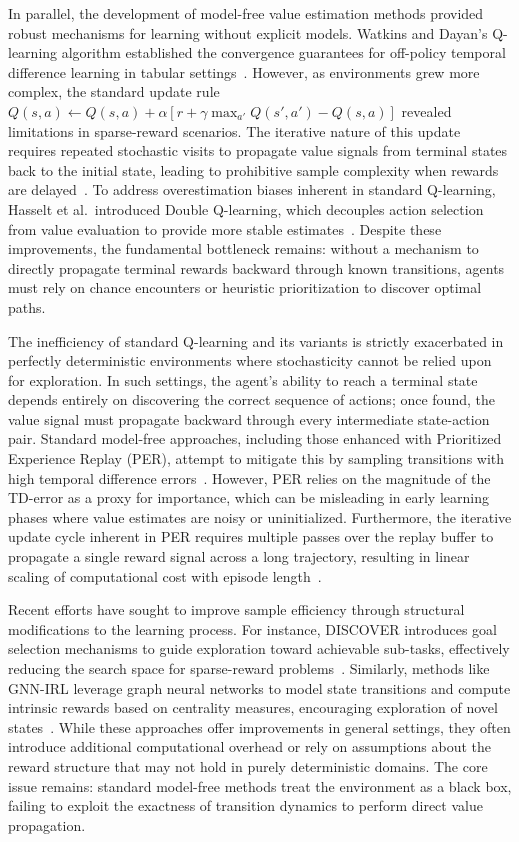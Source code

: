 \documentclass[manuscript, screen, review]{jair}
\begin{document}
In parallel, the development of model-free value estimation methods provided robust mechanisms for learning without explicit models. Watkins and Dayan's Q-learning algorithm established the convergence guarantees for off-policy temporal difference learning in tabular settings~\cite{WatkinsDayan1992Qlearning}. However, as environments grew more complex, the standard update rule $Q(s,a) \leftarrow Q(s,a) + \alpha[r + \gamma \max_{a'} Q(s', a') - Q(s,a)]$ revealed limitations in sparse-reward scenarios. The iterative nature of this update requires repeated stochastic visits to propagate value signals from terminal states back to the initial state, leading to prohibitive sample complexity when rewards are delayed~\cite{Meyn2024ThePB}. To address overestimation biases inherent in standard Q-learning, Hasselt et al.\ introduced Double Q-learning, which decouples action selection from value evaluation to provide more stable estimates~\cite{HasseltGuezSilver2015DoubleQlearning}. Despite these improvements, the fundamental bottleneck remains: without a mechanism to directly propagate terminal rewards backward through known transitions, agents must rely on chance encounters or heuristic prioritization to discover optimal paths.

The inefficiency of standard Q-learning and its variants is strictly exacerbated in perfectly deterministic environments where stochasticity cannot be relied upon for exploration. In such settings, the agent's ability to reach a terminal state depends entirely on discovering the correct sequence of actions; once found, the value signal must propagate backward through every intermediate state-action pair. Standard model-free approaches, including those enhanced with Prioritized Experience Replay (PER), attempt to mitigate this by sampling transitions with high temporal difference errors~\cite{CarrascoDavis2025UncertaintyPE}. However, PER relies on the magnitude of the TD-error as a proxy for importance, which can be misleading in early learning phases where value estimates are noisy or uninitialized. Furthermore, the iterative update cycle inherent in PER requires multiple passes over the replay buffer to propagate a single reward signal across a long trajectory, resulting in linear scaling of computational cost with episode length~\cite{Jin2021BellmanED}.

Recent efforts have sought to improve sample efficiency through structural modifications to the learning process. For instance, DISCOVER introduces goal selection mechanisms to guide exploration toward achievable sub-tasks, effectively reducing the search space for sparse-reward problems~\cite{DiazBone2025DISCOVERAC}. Similarly, methods like GNN-IRL leverage graph neural networks to model state transitions and compute intrinsic rewards based on centrality measures, encouraging exploration of novel states~\cite{Pandian2025EnhancedEI}. While these approaches offer improvements in general settings, they often introduce additional computational overhead or rely on assumptions about the reward structure that may not hold in purely deterministic domains. The core issue remains: standard model-free methods treat the environment as a black box, failing to exploit the exactness of transition dynamics to perform direct value propagation.
\end{document}
